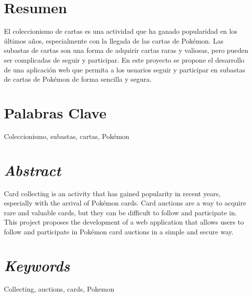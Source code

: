 \section{Resumen}
El coleccionismo de cartas es una actividad que ha ganado popularidad en los últimos años, especialmente con la llegada de las cartas de Pokémon.
Las subastas de cartas son una forma de adquirir cartas raras y valiosas, pero pueden ser complicadas de seguir y participar.
En este proyecto se propone el desarrollo de una aplicación web que permita a los usuarios seguir y participar en subastas de cartas de Pokémon de forma sencilla y segura.


\section{Palabras Clave}
Coleccionismo, subastas, cartas, Pokémon


\section{\textit{Abstract}}
Card collecting is an activity that has gained popularity in recent years, especially with the arrival of Pokémon cards.
Card auctions are a way to acquire rare and valuable cards, but they can be difficult to follow and participate in.
This project proposes the development of a web application that allows users to follow and participate in Pokémon card auctions in a simple and secure way.



\section{\textit{Keywords}}
Collecting, auctions, cards, Pokemon